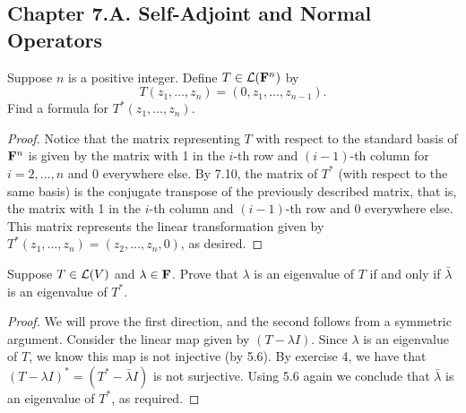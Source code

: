 \subsection*{Chapter 7.A. Self-Adjoint and Normal Operators}


\begin{exercise}{1}
  Suppose $n$ is a positive integer. Define $T\in\mathcal{L}(\mathbf{F}^n)$ by 
  \[T(z_1,\dots,z_n)=(0,z_1,\dots,z_{n-1}).\]
  Find a formula for $T^\ast(z_1,\dots,z_n)$.
\end{exercise}
\begin{proof}
 Notice that the matrix representing $T$ with respect to the standard basis of $\mathbf{F}^n$ is given by the matrix with 1 in the $i$-th row and $(i-1)$-th column for $i=2,\dots,n$ and 0 everywhere else. By 7.10, the matrix of $T^\ast$ (with respect to the same basis) is the conjugate transpose of the previously described matrix, that is, the matrix with 1 in the $i$-th column and $(i-1)$-th row and 0 everywhere else. This matrix represents the linear transformation given by $T^\ast(z_1,\dots,z_n)=(z_2,\dots,z_{n},0)$, as desired.
\end{proof}

\begin{exercise}{2}
  Suppose $T\in\mathcal{L}(V)$ and $\lambda\in\mathbf{F}$. Prove that $\lambda$ is an eigenvalue of $T$ if and only if $\bar{\lambda}$ is an eigenvalue of $T^\ast$.
\end{exercise}
\begin{proof}
 We will prove the first direction, and the second follows from a symmetric argument. Consider the linear map given by $(T-\lambda I)$. Since $\lambda$ is an eigenvalue of $T$, we know this map is not injective (by 5.6). By exercise 4, we have that $(T-\lambda I)^\ast=(T^\ast-\bar{\lambda}I)$ is not surjective. Using 5.6 again we conclude that $\bar{\lambda}$ is an eigenvalue of $T^\ast$, as required.
\end{proof}

